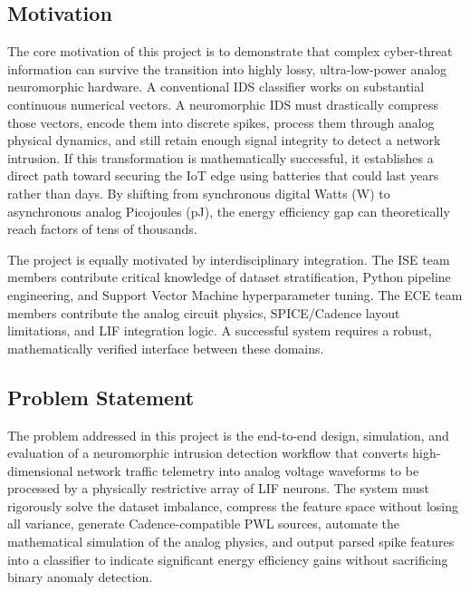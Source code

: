 \documentclass{ieeeaccess}
\begin{document}
\subsection{Motivation}
The core motivation of this project is to demonstrate that complex cyber-threat information can survive the transition into highly lossy, ultra-low-power analog neuromorphic hardware. A conventional IDS classifier works on substantial continuous numerical vectors. A neuromorphic IDS must drastically compress those vectors, encode them into discrete spikes, process them through analog physical dynamics, and still retain enough signal integrity to detect a network intrusion. If this transformation is mathematically successful, it establishes a direct path toward securing the IoT edge using batteries that could last years rather than days. By shifting from synchronous digital Watts (W) to asynchronous analog Picojoules (pJ), the energy efficiency gap can theoretically reach factors of tens of thousands.

The project is equally motivated by interdisciplinary integration. The ISE team members contribute critical knowledge of dataset stratification, Python pipeline engineering, and Support Vector Machine hyperparameter tuning. The ECE team members contribute the analog circuit physics, SPICE/Cadence layout limitations, and LIF integration logic. A successful system requires a robust, mathematically verified interface between these domains.

\subsection{Problem Statement}
The problem addressed in this project is the end-to-end design, simulation, and evaluation of a neuromorphic intrusion detection workflow that converts high-dimensional network traffic telemetry into analog voltage waveforms to be processed by a physically restrictive array of LIF neurons. The system must rigorously solve the dataset imbalance, compress the feature space without losing all variance, generate Cadence-compatible PWL sources, automate the mathematical simulation of the analog physics, and output parsed spike features into a classifier to indicate significant energy efficiency gains without sacrificing binary anomaly detection.
\end{document}
